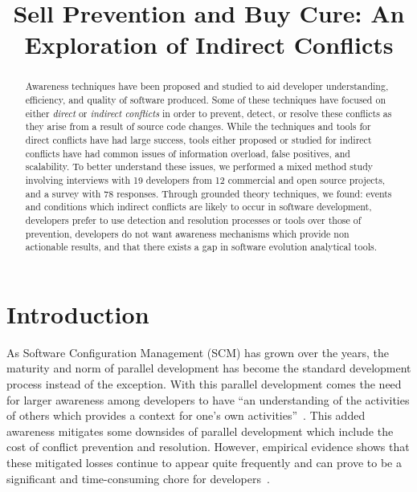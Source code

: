 \documentclass[conference]{IEEEtran}
\begin{document}
\title{Sell Prevention and Buy Cure: An Exploration of Indirect Conflicts}

\author{
}

\maketitle

\begin{abstract}

Awareness techniques have been proposed and studied to aid developer
understanding, efficiency, and quality of software produced. Some of these techniques have focused 
on either \textit{direct} or 
\textit{indirect conflicts} in order to prevent, detect, or resolve these conflicts as they arise
from a result of source code changes. While the techniques and tools for direct conflicts have had
large success, tools either proposed or studied for indirect conflicts have had common issues of
information overload, false positives, and scalability. To better understand these issues, 
we performed a mixed method study involving interviews with 19 developers from 12 commercial and open
source projects, and a survey with 78 responses. Through grounded theory techniques, 
we found: events and conditions which indirect conflicts are likely to occur in
software development, developers prefer to use detection and resolution processes or tools
over those of prevention, developers do not want awareness mechanisms which provide non actionable results,
and that there exists a gap in software evolution analytical tools.

\end{abstract}

\section{Introduction}
\label{sec:intro}

As Software Configuration Management (SCM) has grown over the years, the maturity and norm of parallel 
development has become the standard development process instead of the exception. With this parallel development
comes the need for larger awareness among developers to have ``an understanding of the activities of others
which provides a context for one's own activities''~\cite{Dourish:1992:ACS}. This added awareness
mitigates some downsides of parallel development which include the cost of conflict prevention and resolution. However,
empirical evidence shows that these mitigated losses continue to appear quite frequently and can prove to be a significant
and time-consuming chore for developers~\cite{Perry:2001:PCL}.
\end{document}

